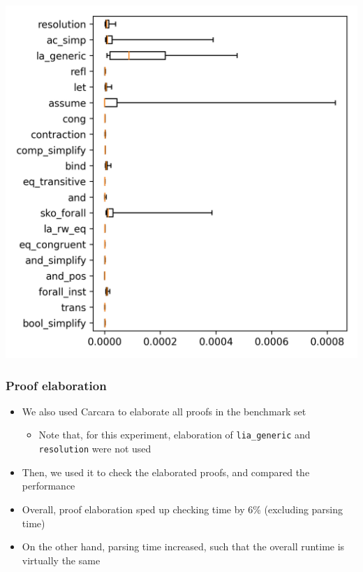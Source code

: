 \documentclass[usepdftitle=false,aspectratio=169]{beamer}
\newcommand\vitem{\vfill\item}
\begin{document}
\begin{frame}
\begin{minipage}{0.48 \textwidth}
    \includegraphics[height=0.9\textheight]{images/by-rules-boxplot.png}
  \end{minipage}
\end{frame}

\begin{frame}
  \frametitle{Proof elaboration}
  \begin{itemize}
    \item We also used Carcara to elaborate all proofs in the benchmark set
    \begin{itemize}
      \item Note that, for this experiment, elaboration of \texttt{lia\_generic}
      and \texttt{resolution} were not used
    \end{itemize}
    \vitem Then, we used it to check the elaborated proofs, and compared the
    performance
    \pause
    \vitem Overall, proof elaboration sped up checking time by 6\% (excluding
    parsing time)
    \pause
    \vitem On the other hand, parsing time increased, such that the overall
    runtime is virtually the same
  \end{itemize}
\end{frame}
\end{document}
